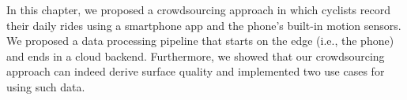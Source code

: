 In this chapter, we proposed a crowdsourcing approach in which cyclists record their daily rides using a smartphone app and the phone's built-in motion sensors.
We proposed a data processing pipeline that starts on the edge (i.e., the phone) and ends in a cloud backend.
Furthermore, we showed that our crowdsourcing approach can indeed derive surface quality and implemented two use cases for using such data.



